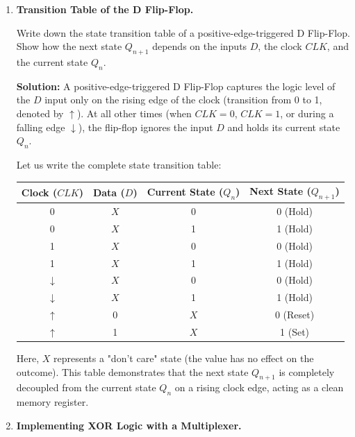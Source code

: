 \documentclass[12pt, a4paper]{book}
\begin{document}
\begin{problembox}
\begin{enumerate}[label=\textbf{E\arabic*.}]
  \item \textbf{Transition Table of the D Flip-Flop.}
  
        Write down the state transition table of a positive-edge-triggered D Flip-Flop.
        Show how the next state $Q_{n+1}$ depends on the inputs $D$, the clock $CLK$, and the current state $Q_n$.
        
        \textbf{Solution:}
        A positive-edge-triggered D Flip-Flop captures the logic level of the $D$ input only on the rising edge of the clock (transition from 0 to 1, denoted by $\uparrow$).
        At all other times (when $CLK = 0$, $CLK = 1$, or during a falling edge $\downarrow$), the flip-flop ignores the input $D$ and holds its current state $Q_n$.
        
        Let us write the complete state transition table:
        
        \begin{center}
        \begin{tabular}{cccc}
          \toprule
          \textbf{Clock ($CLK$)} & \textbf{Data ($D$)} & \textbf{Current State ($Q_n$)} & \textbf{Next State ($Q_{n+1}$)} \\
          \midrule
          0 & $X$ & 0 & 0 (Hold) \\
          0 & $X$ & 1 & 1 (Hold) \\
          1 & $X$ & 0 & 0 (Hold) \\
          1 & $X$ & 1 & 1 (Hold) \\
          $\downarrow$ & $X$ & 0 & 0 (Hold) \\
          $\downarrow$ & $X$ & 1 & 1 (Hold) \\
          $\uparrow$ & 0 & $X$ & 0 (Reset) \\
          $\uparrow$ & 1 & $X$ & 1 (Set) \\
          \bottomrule
        \end{tabular}
        \end{center}
        Here, $X$ represents a "don't care" state (the value has no effect on the outcome).
        This table demonstrates that the next state $Q_{n+1}$ is completely decoupled from the current state $Q_n$ on a rising clock edge, acting as a clean memory register.
        
  \item \textbf{Implementing XOR Logic with a Multiplexer.}
  

\end{enumerate}
\end{problembox}
\end{document}
